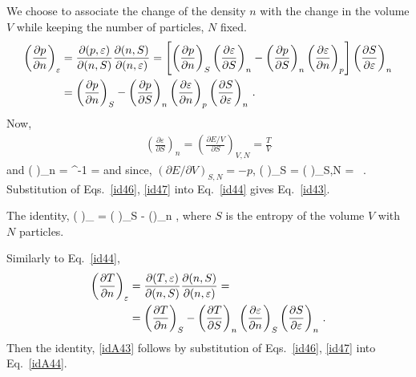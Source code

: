 We choose to associate the change of the density $n$ with the change in the volume $V$ while keeping the number of particles, $N$ fixed.
\begin{align}\label{id44}
\left(\frac{\partial p}{\partial n}\right)_{\varepsilon} & = \frac{ \partial ( p, \varepsilon )}{\partial (n , S) }\frac{ \partial ( n, S )}{\partial (n , \varepsilon) }=
\left[
\left(\frac{\partial p}{\partial n}\right)_{S} \left(\frac{\partial \varepsilon}{\partial S}\right)_{n} 
-
\left(\frac{\partial p}{\partial S}\right)_{n} \left(\frac{\partial \varepsilon}{\partial  n}\right)_{p}
\right] 
\left( \frac{\partial S}{\partial \varepsilon}\right)_{n}
\notag \\
& 
=
\left(\frac{\partial p}{\partial n}\right)_{S} 
-
\left(\frac{\partial p}{\partial S}\right)_{n} \left(\frac{\partial \varepsilon}{\partial  n}\right)_{p}
\left( \frac{\partial S}{\partial \varepsilon}\right)_{n}\, .
\end{align}
Now,
\begin{align}\label{id45}
\left( \frac{\partial \varepsilon}{\partial S}\right)_{n} = \left( \frac{\partial E/V}{\partial S}\right)_{V,N} = \frac{T}{V}
\end{align}
and 
\be\label{id46}
\left( \right)_{n} = ^{-1} = 
\ee
and since, $(\partial E/\partial V)_{S,N} = - p$,
\be\label{id47}
\left( \right)_{S} = \left( \right)_{S,N} =   \, .
\ee
Substitution of Eqs.~\eqref{id46}, \eqref{id47} into Eq.~\eqref{id44} gives Eq.~\eqref{id43}.

The identity,
\be\label{idA43}
\left( \right)_{\varepsilon} = \left( \right)_{S} -  \left(\right)_{n} ,
\ee 
where $S$ is the entropy of the volume $V$ with $N$ particles.

Similarly to Eq.~\eqref{id44},
\begin{align}\label{idA44}
\left(\frac{\partial T}{\partial n}\right)_{\varepsilon} & = \frac{ \partial ( T, \varepsilon )}{\partial (n , S) }\frac{ \partial ( n, S )}{\partial (n , \varepsilon) }=
\notag \\
& 
=
\left(\frac{\partial T}{\partial n}\right)_{S} 
-
\left(\frac{\partial T}{\partial S}\right)_{n} \left(\frac{\partial \varepsilon}{\partial  n}\right)_{S}
\left( \frac{\partial S}{\partial \varepsilon}\right)_{n}\, .
\end{align}
Then the identity, \eqref{idA43} follows by substitution of Eqs.~\eqref{id46}, \eqref{id47} into Eq.~\eqref{idA44}.

